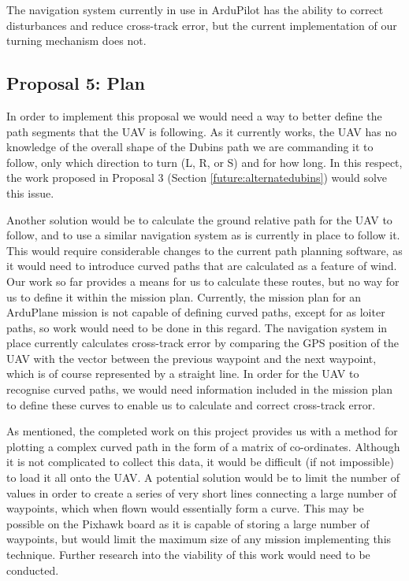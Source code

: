 The navigation system currently in use in ArduPilot has the ability to correct disturbances and reduce cross-track error, but the current implementation of our turning mechanism does not. 

\subsection{Proposal 5: Plan} 
\label{future:gustsplan}

In order to implement this proposal we would need a way to better define the path segments that the UAV is following. As it currently works, the UAV has no knowledge of the overall shape of the Dubins path we are commanding it to follow, only which direction to turn (L, R, or S) and for how long. In this respect, the work proposed in Proposal 3 (Section \ref{future:alternatedubins}) would solve this issue. 

Another solution would be to calculate the ground relative path for the UAV to follow, and to use a similar navigation system as is currently in place to follow it. This would require considerable changes to the current path planning software, as it would need to introduce curved paths that are calculated as a feature of wind. Our work so far provides a means for us to calculate these routes, but no way for us to define it within the mission plan. Currently, the mission plan for an ArduPlane mission is not capable of defining curved paths, except for as loiter paths, so work would need to be done in this regard. The navigation system in place currently calculates cross-track error by comparing the GPS position of the UAV with the vector between the previous waypoint and the next waypoint, which is of course represented by a straight line. In order for the UAV to recognise curved paths, we would need information included in the mission plan to define these curves to enable us to calculate and correct cross-track error. 

As mentioned, the completed work on this project provides us with a method for plotting a complex curved path in the form of a matrix of co-ordinates. Although it is not complicated to collect this data, it would be difficult (if not impossible) to load it all onto the UAV. A potential solution would be to limit the number of values in order to create a series of very short lines connecting a large number of waypoints, which when flown would essentially form a curve. This may be possible on the Pixhawk board as it is capable of storing a large number of waypoints, but would limit the maximum size of any mission implementing this technique. Further research into the viability of this work would need to be conducted.

